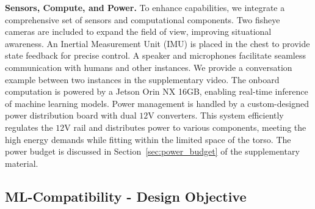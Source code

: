 \textbf{Sensors, Compute, and Power.} To enhance \systems capabilities, we integrate a comprehensive set of sensors and computational components. Two fisheye cameras are included to expand the field of view, improving situational awareness. An Inertial Measurement Unit (IMU) is placed in the chest to provide state feedback for precise control. A speaker and microphones facilitate seamless communication with humans and other \system instances. We provide a conversation example between two \system instances in the supplementary video.
The onboard computation is powered by a Jetson Orin NX 16GB, enabling real-time inference of machine learning models. 
Power management is handled by a custom-designed power distribution board with dual $12\mathrm{V}$ converters. This system efficiently regulates the $12\mathrm{V}$ rail and distributes power to various components, meeting the high energy demands while fitting within the limited space of the torso. The power budget is discussed in Section~\ref{sec:power_budget} of the supplementary material.





\subsection{ML-Compatibility - Design Objective}

